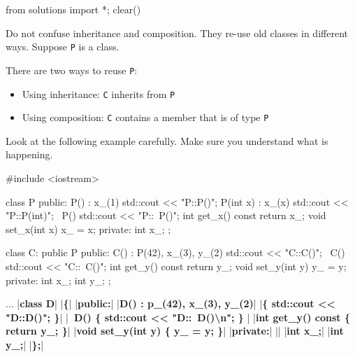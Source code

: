 \begin{python0}
from solutions import *; clear()
\end{python0}

Do not confuse inheritance and composition. They re-use old classes in
different ways. Suppose \verb!P! is a class.

There are two ways to reuse \verb!P!:

\begin{itemize}
\item
  Using inheritance: \verb!C! inherits from \verb!P!
\item
  Using composition: \verb!C! contains a member that is of type \verb!P!
\end{itemize}

Look at the following example carefully. Make sure you understand what
is happening.
\begin{console}
#include <iostream>

class P
{
public:
        P() : x_(1) { std::cout << "P::P()\n"; }
        P(int x) : x_(x) { std::cout << "P::P(int)\n"; }
        ~P() { std::cout << "P::~P()\n"; }
        int get_x() const { return x_; }
        void set_x(int x) { x_ = x; }
private:
        int x_;
};

class C: public P
{
public:
        C() : P(42), x_(3), y_(2)
        { std::cout << "C::C()"; }
        ~C() { std::cout << "C::~C()\n"; }
        int get_y() const { return y_; }
        void set_y(int y) { y_ = y; }
private:
        int x_;
        int y_;
};
\end{console}

\newpage\begin{consolethree}[escapeinside=||]
...
|\textbf{class D}|
|\textbf{\{}|
|\textbf{public:}|
        |\textbf{D() : p\_(42), x\_(3), y\_(2)}|
        |\textbf{\{ std::cout << "D::D()"; \}}|
        |\textbf{~D() \{ std::cout << "D::~D()\textbackslash n"; \}} |
        |\textbf{int get\_y() const \{ return y\_; \}}|
        |\textbf{void set\_y(int y) \{ y\_ = y; \}}|
|\textbf{private:}|
        || 
        |\textbf{int x\_;}|
        |\textbf{int y\_;}|
|\textbf{\};}|
\end{consolethree}

